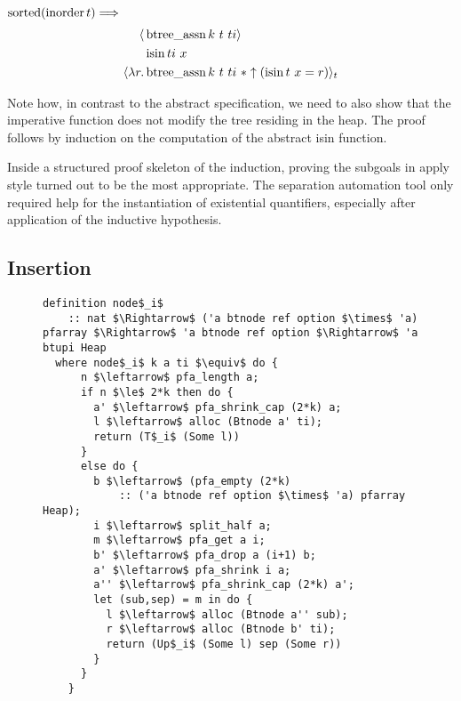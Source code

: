 \begin{lemma} $\operatorname{sorted} (\operatorname{inorder} t) \Longrightarrow$ \\
\begin{align*}
   \langle &\operatorname{btree\_assn} k\ t\ ti\rangle \\
           &\operatorname{isin} ti\ x \\
   \langle \lambda r. &\operatorname{btree\_assn} k\ t\ ti\ * \uparrow(\operatorname{isin} t\ x = r)\rangle_t
\end{align*}
\end{lemma}

Note how, in contrast to the abstract specification,
we need to also show that the imperative function does not modify the tree
residing in the heap.
The proof follows by induction on the computation of the abstract isin function.

Inside a structured proof skeleton of the induction,
proving the subgoals in apply style turned out to be the most
appropriate.
The separation automation tool only required help
for the instantiation of existential quantifiers,
especially after application of the inductive hypothesis. 

\subsection{Insertion}
\begin{figure}
\begin{lstlisting}[mathescape=true, language=Isabelle, label={lst:imp-nodei-fun},
    caption={The imperative node$_i$ function}]
definition node$_i$ 
    :: nat $\Rightarrow$ ('a btnode ref option $\times$ 'a) pfarray $\Rightarrow$ 'a btnode ref option $\Rightarrow$ 'a btupi Heap
  where node$_i$ k a ti $\equiv$ do {
      n $\leftarrow$ pfa_length a;
      if n $\le$ 2*k then do {
        a' $\leftarrow$ pfa_shrink_cap (2*k) a;
        l $\leftarrow$ alloc (Btnode a' ti);
        return (T$_i$ (Some l))
      }
      else do {
        b $\leftarrow$ (pfa_empty (2*k)
            :: ('a btnode ref option $\times$ 'a) pfarray Heap);
        i $\leftarrow$ split_half a;
        m $\leftarrow$ pfa_get a i;
        b' $\leftarrow$ pfa_drop a (i+1) b;
        a' $\leftarrow$ pfa_shrink i a; 
        a'' $\leftarrow$ pfa_shrink_cap (2*k) a';
        let (sub,sep) = m in do {
          l $\leftarrow$ alloc (Btnode a'' sub);
          r $\leftarrow$ alloc (Btnode b' ti);
          return (Up$_i$ (Some l) sep (Some r))
        }
      }
    }

\end{lstlisting}
\end{figure}

